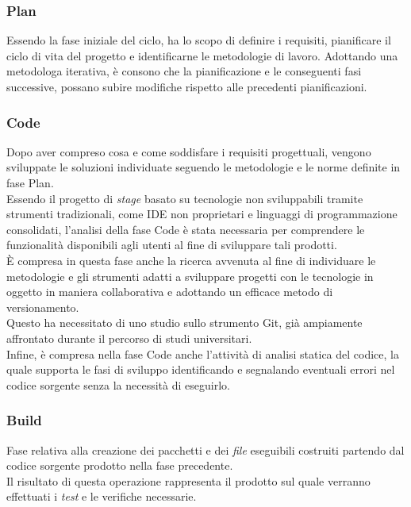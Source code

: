 \subsubsection*{Plan}
Essendo la fase iniziale del ciclo, ha lo scopo di definire i requisiti, pianificare il ciclo di vita del progetto e identificarne le metodologie di lavoro. Adottando una metodologa iterativa, è consono che la pianificazione e le conseguenti fasi successive, possano subire modifiche rispetto alle precedenti pianificazioni.

\subsubsection*{Code}
Dopo aver compreso cosa e come soddisfare i requisiti progettuali, vengono sviluppate le soluzioni individuate seguendo le metodologie e le norme definite in fase Plan.\\
Essendo il progetto di \emph{stage} basato su tecnologie non sviluppabili tramite strumenti tradizionali, come IDE non proprietari e linguaggi di programmazione consolidati, l'analisi della fase Code è stata necessaria per comprendere le funzionalità disponibili agli utenti al fine di sviluppare tali prodotti.\\
È compresa in questa fase anche la ricerca avvenuta al fine di individuare le metodologie e gli strumenti adatti a sviluppare progetti con le tecnologie in oggetto in maniera collaborativa e adottando un efficace metodo di versionamento.\\
Questo ha necessitato di uno studio sullo strumento Git, già ampiamente affrontato durante il percorso di studi universitari.\\
Infine, è compresa nella fase Code anche l'attività di analisi statica del codice, la quale supporta le fasi di sviluppo identificando e segnalando eventuali errori nel codice sorgente senza la necessità di eseguirlo.

\subsubsection*{Build}
Fase relativa alla creazione dei pacchetti e dei \emph{file} eseguibili costruiti partendo dal codice sorgente prodotto nella fase precedente.\\
Il risultato di questa operazione rappresenta il prodotto sul quale verranno effettuati i \emph{test} e le verifiche necessarie. 

